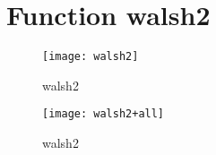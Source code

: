 \newpage

\section{Function walsh2}
\begin{center}

\end{center}

\begin{center}
\begin{figure}[h]
\centering
\texttt{[image: walsh2]}
\caption{walsh2}
\end{figure}
\end{center}

\begin{center}
\begin{figure}[h]
\centering
\texttt{[image: walsh2+all]}
\caption{walsh2}
\end{figure}
\end{center}

